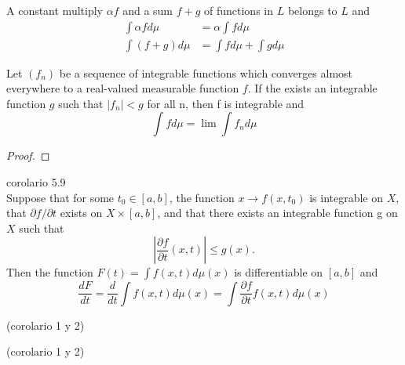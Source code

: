 \begin{theorem}
    A constant multiply $\alpha f$ and a sum $f + g$ of functions in $L$ belongs
    to $L$ and
    \begin{align*}
         \int \alpha fd\mu &= \alpha \int f d\mu \\
         \int (f + g)d\mu  &= \int fd\mu + \int gd\mu
    \end{align*}
\end{theorem}
\begin{theorem}
    Let $(f_n)$ be a sequence of integrable functions which converges almost
    everywhere to a real-valued measurable function $f$. If the exists an 
    integrable function $g$ such that $|f_n| < g$ for all n, then f is integrable
    and
    $$
    \int f d\mu = \lim \int f_n d\mu
    $$
\end{theorem}
\begin{proof}

\end{proof}
\begin{corollary}
corolario 5.9 \\
    Suppose that for some $t_0 \in [a,b]$,  the function $x \rightarrow f(x, t_0)$
    is integrable on $X$, that $\partial f / \partial t$ exists on 
    $X \times [a,b]$, and that there exists an integrable function g on $X$ such 
    that
    $$
        \left|\dfrac{\partial f}{\partial t} (x,t) \right| \leq g(x).
    $$
    Then the function $F(t) = \displaystyle \int f(x,t)d\mu(x)$ is differentiable 
    on $[a,b]$ and
    $$
         \dfrac{dF}{dt} = \dfrac{d }{dt} 
         \int f(x,t)d\mu(x)  = \int \dfrac{\partial f}{\partial t} f(x,t)d\mu(x)
    $$
\end{corollary}
\begin{theorem}
    
\end{theorem}
\begin{theorem}[Lagrange]
    
\end{theorem}
\begin{corollary}
(corolario 1 y 2)
\end{corollary}

\begin{corollary}
(corolario 1 y 2)
\end{corollary}


